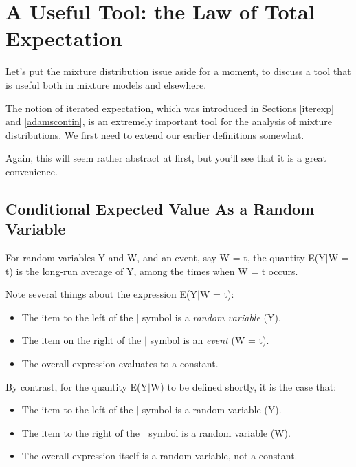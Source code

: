 \documentclass[11pt]{article}
\begin{document}
\section{A Useful Tool:  the Law of Total Expectation}
\label{lte}

Let's put the mixture distribution issue aside for a moment, to discuss
a tool that is useful both in mixture models and elsewhere.

The notion of iterated expectation, which was introduced in Sections
\ref{iterexp} and \ref{adamscontin}, is an extremely important
tool for the analysis of mixture distributions.  We first need to extend
our earlier definitions somewhat.

Again, this will seem rather abstract at first, but you'll see that it
is a great convenience.

\subsection{Conditional Expected Value As a Random Variable}

For random variables Y and W, and an event, say W = t, the quantity
E(Y$|$W = t) is the long-run average of Y, among the times when W = t
occurs.  

Note several things about the expression E(Y$|$W = t):

\begin{itemize}

\item The item to the left of the $|$ symbol is a {\it random variable} (Y).

\item The item on the right of the $|$ symbol is an {\it event} (W = t).

\item The overall expression evaluates to a constant.

\end{itemize}

By contrast, for the quantity E(Y$|$W) to be defined shortly,
it is the case that:

\begin{itemize}

\item The item to the left of the $|$ symbol is a random variable (Y).

\item The item to the right of the $|$ symbol is a random variable (W).

\item The overall expression itself is a random variable, not a constant.

\end{itemize}
\end{document}
